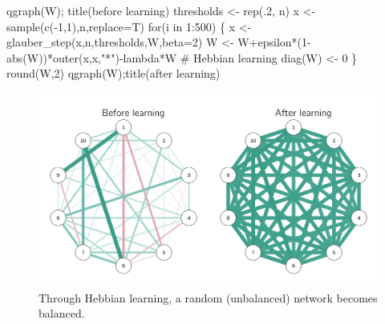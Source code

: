 \documentclass[
  a4paper,
  DIV=11,
  numbers=noendperiod]{scrreprt}
\newenvironment{Shaded}{\begin{snugshade}}{\end{snugshade}}
\newcommand{\AttributeTok}[1]{\textcolor[rgb]{0.40,0.45,0.13}{#1}}
\newcommand{\CommentTok}[1]{\textcolor[rgb]{0.37,0.37,0.37}{#1}}
\newcommand{\ControlFlowTok}[1]{\textcolor[rgb]{0.00,0.23,0.31}{#1}}
\newcommand{\DecValTok}[1]{\textcolor[rgb]{0.68,0.00,0.00}{#1}}
\newcommand{\FunctionTok}[1]{\textcolor[rgb]{0.28,0.35,0.67}{#1}}
\newcommand{\NormalTok}[1]{\textcolor[rgb]{0.00,0.23,0.31}{#1}}
\newcommand{\OtherTok}[1]{\textcolor[rgb]{0.00,0.23,0.31}{#1}}
\newcommand{\SpecialCharTok}[1]{\textcolor[rgb]{0.37,0.37,0.37}{#1}}
\newcommand{\StringTok}[1]{\textcolor[rgb]{0.13,0.47,0.30}{#1}}
\begin{document}
\begin{Shaded}
\begin{Highlighting}[]
\FunctionTok{qgraph}\NormalTok{(W); }\FunctionTok{title}\NormalTok{(}\StringTok{\textquotesingle{}before learning\textquotesingle{}}\NormalTok{)}
\NormalTok{thresholds }\OtherTok{\textless{}{-}} \FunctionTok{rep}\NormalTok{(.}\DecValTok{2}\NormalTok{, n)}
\NormalTok{x }\OtherTok{\textless{}{-}} \FunctionTok{sample}\NormalTok{(}\FunctionTok{c}\NormalTok{(}\SpecialCharTok{{-}}\DecValTok{1}\NormalTok{,}\DecValTok{1}\NormalTok{),n,}\AttributeTok{replace=}\NormalTok{T)}
\ControlFlowTok{for}\NormalTok{(i }\ControlFlowTok{in} \DecValTok{1}\SpecialCharTok{:}\DecValTok{500}\NormalTok{)}
\NormalTok{\{}
\NormalTok{x }\OtherTok{\textless{}{-}} \FunctionTok{glauber\_step}\NormalTok{(x,n,thresholds,W,}\AttributeTok{beta=}\DecValTok{2}\NormalTok{)}
\NormalTok{W }\OtherTok{\textless{}{-}}\NormalTok{ W}\SpecialCharTok{+}\NormalTok{epsilon}\SpecialCharTok{*}\NormalTok{(}\DecValTok{1}\SpecialCharTok{{-}}\FunctionTok{abs}\NormalTok{(W))}\SpecialCharTok{*}\FunctionTok{outer}\NormalTok{(x,x,}\StringTok{"*"}\NormalTok{)}\SpecialCharTok{{-}}\NormalTok{lambda}\SpecialCharTok{*}\NormalTok{W }\CommentTok{\# Hebbian learning}
\FunctionTok{diag}\NormalTok{(W) }\OtherTok{\textless{}{-}} \DecValTok{0}
\NormalTok{\}}
\FunctionTok{round}\NormalTok{(W,}\DecValTok{2}\NormalTok{)}
\FunctionTok{qgraph}\NormalTok{(W);}\FunctionTok{title}\NormalTok{(}\StringTok{\textquotesingle{}after learning\textquotesingle{}}\NormalTok{)}
\end{Highlighting}
\end{Shaded}

\begin{figure}

{\centering \includegraphics{media/ch6/fig-ch6-img14-old-83.png}

}

\caption{\label{fig-ch6-img14-old-83}Through Hebbian learning, a random
(unbalanced) network becomes balanced.}

\end{figure}
\end{document}
